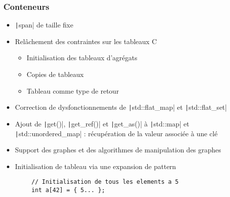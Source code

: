 \documentclass[C++.tex]{subfiles}
\begin{document}
\begin{frame}[fragile]
	\frametitle{Conteneurs}
	\begin{itemize}
		\item \texttt|span| de taille fixe
		\item Relâchement des contraintes sur les tableaux C
		\begin{itemize}
			\item Initialisation des tableaux d'agrégats
			\item Copies de tableaux
			\item Tableau comme type de retour
		\end{itemize}
		\item Correction de dysfonctionnements de \texttt|std::flat_map| et \texttt|std::flat_set|
		\item Ajout de \texttt|get()|, \texttt|get_ref()| et \texttt|get_as()| à \texttt|std::map| et \texttt|std::unordered_map| : récupération de la valeur associée à une clé
		\item Support des graphes et des algorithmes de manipulation des graphes
		\item Initialisation de tableau via une expansion de pattern
	\end{itemize}

	\begin{verbatim}
		// Initialisation de tous les elements a 5
		int a[42] = { 5... };
	\end{verbatim}

\end{frame}
\end{document}
